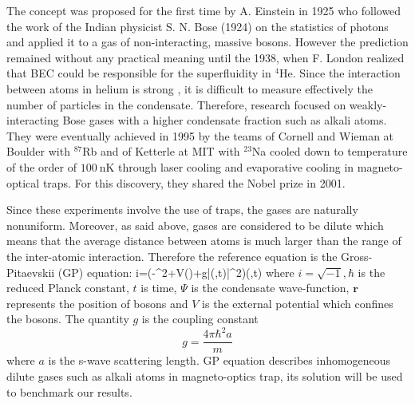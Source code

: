 The concept was proposed for the first time by A. Einstein in 1925 who followed the work of the Indian physicist S. N. Bose (1924) on the statistics of photons and applied it to a gas of non-interacting, massive bosons. However the prediction remained without any practical meaning until the 1938, when F. London realized that BEC could be responsible for the superfluidity in $^4$He. Since the interaction between  atoms in helium is strong \cite{pethick_smith_2008}, it is difficult to measure effectively the number of particles in the condensate. Therefore, research focused on weakly-interacting Bose gases with a higher condensate fraction such as alkali atoms. They were eventually achieved in 1995 by the teams of Cornell and Wieman at Boulder with $^{87}$Rb and of Ketterle at MIT with $^{23}$Na cooled down to temperature of the order of $100\ \si{\nano\kelvin}$ through laser cooling and evaporative cooling in magneto-optical traps. For this discovery, they shared the Nobel prize in 2001. 


Since these experiments involve the use of traps, the gases are naturally nonuniform. Moreover, as said above, gases are considered to be dilute which means that the average distance between atoms is much larger than the range of the inter-atomic interaction. Therefore the reference equation is the Gross-Pitaevskii (GP) equation:
\beq
\label{GP}
i\hbar{}=\bigg(-\nabla^2+V()+g|\Psi(,t)|^2\bigg)\Psi(,t)
\eeq
where $i=\sqrt{-1}, \hbar$ is the reduced Planck constant, $t$ is time, $\Psi$ is the condensate wave-function, $\mathbf{r}$ represents the position of bosons and $V$ is the external potential which confines the bosons. The quantity $g$ is the coupling constant 
\begin{equation*}
	g=\frac{4\pi\hbar^2a}{m}
\end{equation*}
where $a$ is the s-wave scattering length. GP equation describes inhomogeneous dilute gases such as alkali atoms in magneto-optics trap, its solution will be used to benchmark our results.

